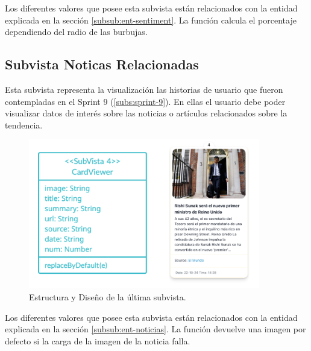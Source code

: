 Los diferentes valores que posee esta subvista están relacionados con la entidad explicada en la sección \ref{subsub:ent-sentiment}. La función calcula el porcentaje dependiendo del radio de las burbujas.

\subsection{Subvista Noticas Relacionadas}\label{subs:vista-noti}
Esta subvista representa la visualización las historias de usuario que fueron contempladas en el Sprint 9 (\ref{subs:sprint-9}). En ellas el usuario debe poder visualizar datos de interés sobre las noticias o artículos relacionados sobre la tendencia.

\begin{figure}[H]
    \centering
    \myfloatalign
    \includegraphics[width=0.9\textwidth]{gfx/subvista3.png}
    \caption[Estructura y Diseño de la última subvista]{Estructura y Diseño de la última subvista.}\label{gfx:subvista3}
\end{figure}

Los diferentes valores que posee esta subvista están relacionados con la entidad explicada en la sección \ref{subsub:ent-noticias}. La función devuelve una imagen por defecto si la carga de la imagen de la noticia falla.